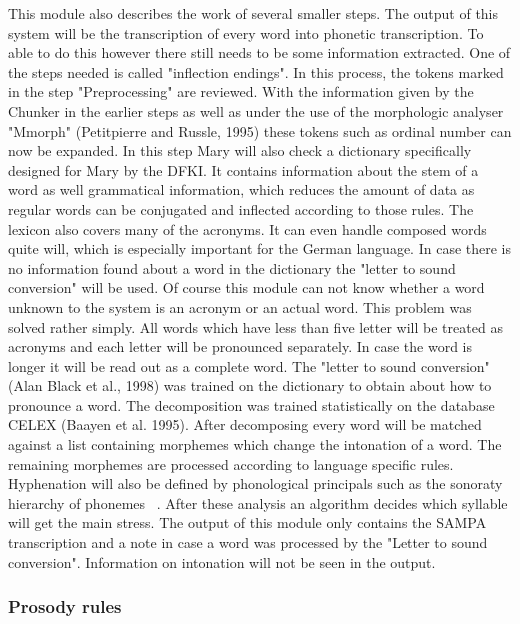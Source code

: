 \documentclass[a4paper, 12pt]{article}
\begin{document}
This module also describes the work of several smaller steps.
The output of this system will be the transcription of every word into phonetic transcription.
To able to do this however there still needs to be some information extracted.
One of the steps needed is called "inflection endings". 
In this process, the tokens marked in the step "Preprocessing" are reviewed.
With the information given by the Chunker in the earlier steps as well as under the use of the morphologic analyser "Mmorph" (Petitpierre and Russle, 1995) these tokens such as ordinal number can now be expanded.\newline 
In this step Mary will also check a dictionary specifically designed for Mary by the DFKI.
It contains information about the stem of a word as well grammatical information, which reduces the amount of data as regular words can be conjugated and inflected according to those rules.
The lexicon also covers many of the acronyms. 
It can even handle composed words quite will, which is especially important for the German language. \newline 
In case there is no information found about a word in the dictionary the "letter to sound conversion" will be used.
Of course this module can not know whether a word unknown to the system is an acronym or an actual word. 
This problem was solved rather simply. 
All words which have less than five letter will be treated as acronyms and each letter will be pronounced separately. 
In case the word is longer it will be read out as a complete word.
The "letter to sound conversion" (Alan Black et al., 1998) was trained on the dictionary to obtain about how to pronounce a word.
The decomposition was trained statistically on the database CELEX (Baayen et al. 1995).
After decomposing every word will be matched against a list containing morphemes which change the intonation of a word.
The remaining morphemes are processed according to language specific rules.
Hyphenation will also be defined by phonological principals such as the sonoraty hierarchy of phonemes ~\cite{marytts}. After these analysis an algorithm decides which syllable will get the main stress.\newline
The output of this module only contains the SAMPA transcription and a note in case a word was processed by the "Letter to sound conversion". 
Information on intonation will not be seen in the output.

\subsubsection*{Prosody rules}
\end{document}
